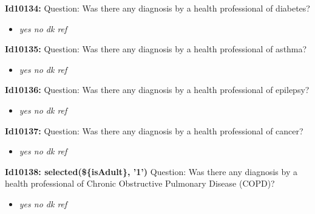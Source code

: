 \documentclass{article}%
\begin{document}
\textbf{Id10134: \newline%
}%
Question: Was there any diagnosis by a health professional of diabetes?\newline%
%
\begin{itemize}%
\item%
\textit{yes\newline%
 no\newline%
 dk\newline%
 ref\newline%
}%
\end{itemize}%
\textbf{Id10135: \newline%
}%
Question: Was there any diagnosis by a health professional of asthma?\newline%
%
\begin{itemize}%
\item%
\textit{yes\newline%
 no\newline%
 dk\newline%
 ref\newline%
}%
\end{itemize}%
\textbf{Id10136: \newline%
}%
Question: Was there any diagnosis by a health professional of epilepsy?\newline%
%
\begin{itemize}%
\item%
\textit{yes\newline%
 no\newline%
 dk\newline%
 ref\newline%
}%
\end{itemize}%
\textbf{Id10137: \newline%
}%
Question: Was there any diagnosis by a health professional of cancer?\newline%
%
\begin{itemize}%
\item%
\textit{yes\newline%
 no\newline%
 dk\newline%
 ref\newline%
}%
\end{itemize}%
\textbf{Id10138: selected(\$\{isAdult\}, '1')\newline%
}%
Question: Was there any diagnosis by a health professional of Chronic Obstructive Pulmonary Disease (COPD)?\newline%
%
\begin{itemize}%
\item%
\textit{yes\newline%
 no\newline%
 dk\newline%
 ref\newline%
}%
\end{itemize}%
\end{document}
